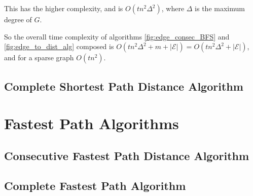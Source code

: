 \documentclass{article}
\theoremstyle{definition}
\numberwithin{thm}{subsection}
\begin{document}
This has the higher complexity, and is $O(tn^2\Delta^2)$, where
$\Delta$ is the maximum degree of $G$.

So the overall time complexity of algorithms \ref{fig:edge_consec_BFS} and
\ref{fig:edge_to_dist_alg} composed is $O(tn^2\Delta^2 + m + |\mathcal{E}|) =
O(tn^2\Delta^2 + |\mathcal{E}|)$, and for a sparse graph $O(tn^2)$.


\subsection{Complete Shortest Path Distance Algorithm}

\section{Fastest Path Algorithms}

\subsection{Consecutive Fastest Path Distance Algorithm}

\subsection{Complete Fastest Path Algorithm}
\end{document}
